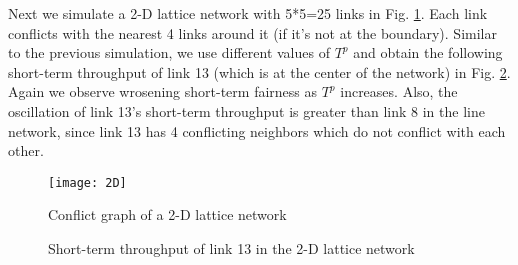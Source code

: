\documentclass{IEEEtran}
\begin{document}
Next we simulate a 2-D lattice network with 5{*}5=25 links in Fig.
\ref{fig:2d}. Each link conflicts with the nearest 4 links around
it (if it's not at the boundary). Similar to the previous simulation,
we use different values of $T^{p}$ and obtain the following short-term
throughput of link 13 (which is at the center of the network) in Fig.
\ref{fig:st-2d}. Again we observe wrosening short-term fairness as
$T^{p}$ increases. Also, the oscillation of link 13's short-term
throughput is greater than link 8 in the line network, since link
13 has 4 conflicting neighbors which do not conflict with each other.
\begin{figure}
\begin{centering}
\texttt{[image: 2D]}
\par\end{centering}

\caption{\label{fig:2d}Conflict graph of a 2-D lattice network}

\end{figure}
\begin{figure}
\begin{centering}
\par\end{centering}

\begin{centering}
\par\end{centering}

\begin{centering}
\par\end{centering}

\begin{centering}
\par\end{centering}

\caption{\label{fig:st-2d}Short-term throughput of link 13 in the 2-D lattice
network}

\end{figure}
\end{document}
